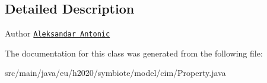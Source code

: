 \subsection{Detailed Description}
\begin{DoxyAuthor}{Author}
\href{mailto:aleksandar.antonic@fer.hr}{\tt Aleksandar Antonic} 
\end{DoxyAuthor}


The documentation for this class was generated from the following file\+:\begin{DoxyCompactItemize}
\item 
src/main/java/eu/h2020/symbiote/model/cim/Property.\+java\end{DoxyCompactItemize}
